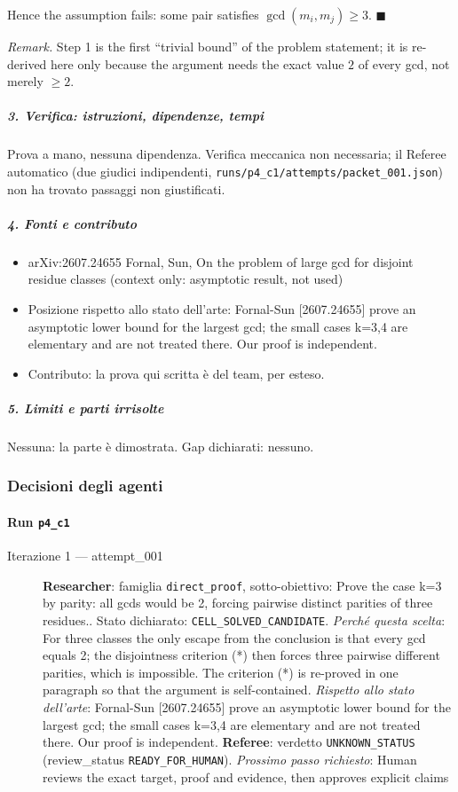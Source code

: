 \documentclass[11pt,a4paper]{article}
\providecommand{\tightlist}{\setlength{\itemsep}{0pt}\setlength{\parskip}{0pt}}
\begin{document}
Hence the assumption fails: some pair satisfies \(\gcd(m_i,m_j)\ge3\).
\(\blacksquare\)

\emph{Remark.} Step 1 is the first ``trivial bound'' of the problem
statement; it is re-derived here only because the argument needs the
exact value \(2\) of every gcd, not merely \(\ge2\).

\subparagraph{3. Verifica: istruzioni, dipendenze,
tempi}\label{verifica-istruzioni-dipendenze-tempi}

Prova a mano, nessuna dipendenza. Verifica meccanica non necessaria; il
Referee automatico (due giudici indipendenti,
\texttt{runs/p4\_c1/attempts/packet\_001.json}) non ha trovato passaggi
non giustificati.

\subparagraph{4. Fonti e contributo}\label{fonti-e-contributo}

\begin{itemize}
\tightlist
\item
  arXiv:2607.24655 Fornal, Sun, On the problem of large gcd for disjoint
  residue classes (context only: asymptotic result, not used)
\item
  Posizione rispetto allo stato dell'arte: Fornal-Sun {[}2607.24655{]}
  prove an asymptotic lower bound for the largest gcd; the small cases
  k=3,4 are elementary and are not treated there. Our proof is
  independent.
\item
  Contributo: la prova qui scritta è del team, per esteso.
\end{itemize}

\subparagraph{5. Limiti e parti
irrisolte}\label{limiti-e-parti-irrisolte}

Nessuna: la parte è dimostrata. Gap dichiarati: nessuno.

\subsubsection{Decisioni degli agenti}
\paragraph{Run \texttt{p4\_c1}}
\begin{description}
\item[Iterazione 1 — attempt\_001]
\textbf{Researcher}: famiglia \texttt{direct\_proof}, sotto-obiettivo: Prove the case k=3 by parity: all gcds would be 2, forcing pairwise distinct parities of three residues.. Stato dichiarato: \texttt{CELL\_SOLVED\_CANDIDATE}.
\emph{Perché questa scelta}: For three classes the only escape from the conclusion is that every gcd equals 2; the disjointness criterion (*) then forces three pairwise different parities, which is impossible. The criterion (*) is re-proved in one paragraph so that the argument is self-contained.
\emph{Rispetto allo stato dell'arte}: Fornal-Sun [2607.24655] prove an asymptotic lower bound for the largest gcd; the small cases k=3,4 are elementary and are not treated there. Our proof is independent.
\textbf{Referee}: verdetto \texttt{UNKNOWN\_STATUS} (review\_status \texttt{READY\_FOR\_HUMAN}).
\emph{Prossimo passo richiesto}: Human reviews the exact target, proof and evidence, then approves explicit claims
\end{description}
\end{document}
